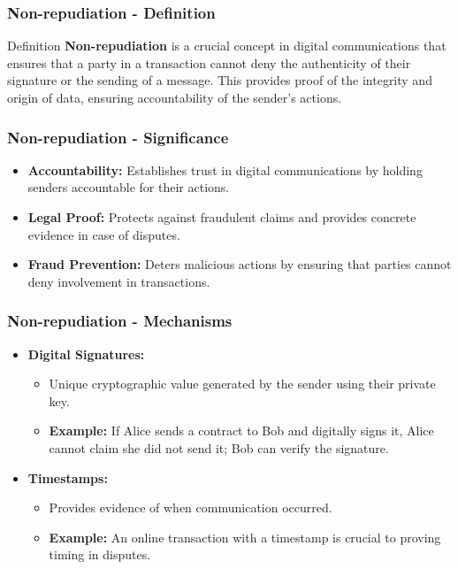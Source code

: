 \documentclass{beamer}
\begin{document}
\begin{frame}[fragile]
    \frametitle{Non-repudiation - Definition}
    \begin{block}{Definition}
        \textbf{Non-repudiation} is a crucial concept in digital communications that ensures that a party in a transaction cannot deny the authenticity of their signature or the sending of a message. This provides proof of the integrity and origin of data, ensuring accountability of the sender's actions.
    \end{block}
\end{frame}

\begin{frame}[fragile]
    \frametitle{Non-repudiation - Significance}
    \begin{itemize}
        \item \textbf{Accountability:} Establishes trust in digital communications by holding senders accountable for their actions.
        \item \textbf{Legal Proof:} Protects against fraudulent claims and provides concrete evidence in case of disputes.
        \item \textbf{Fraud Prevention:} Deters malicious actions by ensuring that parties cannot deny involvement in transactions.
    \end{itemize}
\end{frame}

\begin{frame}[fragile]
    \frametitle{Non-repudiation - Mechanisms}
    \begin{itemize}
        \item \textbf{Digital Signatures:} 
            \begin{itemize}
                \item Unique cryptographic value generated by the sender using their private key.
                \item \textbf{Example:} If Alice sends a contract to Bob and digitally signs it, Alice cannot claim she did not send it; Bob can verify the signature.
            \end{itemize}
        \item \textbf{Timestamps:}
            \begin{itemize}
                \item Provides evidence of when communication occurred.
                \item \textbf{Example:} An online transaction with a timestamp is crucial to proving timing in disputes.
            \end{itemize}
    \end{itemize}
\end{frame}
\end{document}
